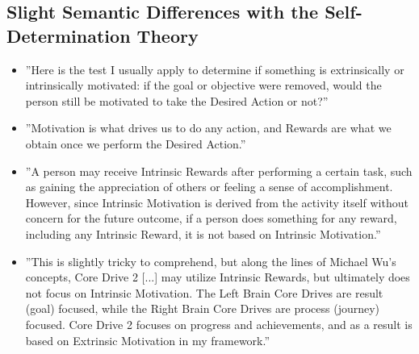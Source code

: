 \subsection{Slight Semantic Differences with the Self-Determination Theory}
\begin{itemize}
    \item ''Here is the test I usually apply to determine if something is extrinsically or intrinsically motivated: if the goal or objective were removed, would the person still be motivated to take the Desired Action or not?''
    \item ''Motivation is what drives us to do any action, and Rewards are what we obtain once we perform the Desired Action.''
    \item ''A person may receive Intrinsic Rewards after performing a certain task, such as gaining the appreciation of others or feeling a sense of accomplishment. However, since Intrinsic Motivation is derived from the activity itself without concern for the future outcome, if a person does something for any reward, including any Intrinsic Reward, it is not based on Intrinsic Motivation.''
    \item ''This is slightly tricky to comprehend, but along the lines of Michael Wu's concepts, Core Drive 2 [...] may utilize Intrinsic Rewards, but ultimately does not focus on Intrinsic Motivation. The Left Brain Core Drives are result (goal) focused, while the Right Brain Core Drives are process (journey) focused. Core Drive 2 focuses on progress and achievements, and as a result is based on Extrinsic Motivation in my framework.'' 
\end{itemize}

